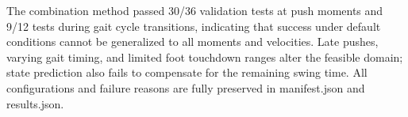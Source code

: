 The combination method passed 30/36 validation tests at push moments and 9/12 tests during gait cycle transitions, indicating that success under default conditions cannot be generalized to all moments and velocities. Late pushes, varying gait timing, and limited foot touchdown ranges alter the feasible domain; state prediction also fails to compensate for the remaining swing time. All configurations and failure reasons are fully preserved in manifest.json and results.json.


\FloatBarrier\begingroup\small\setlength{\tabcolsep}{2.5pt}
